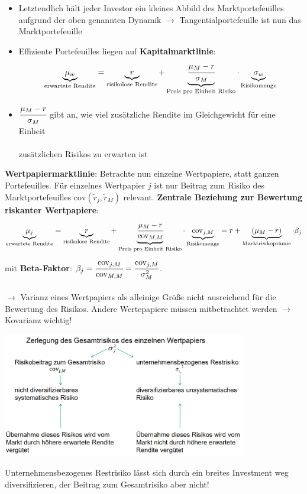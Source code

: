 \pagebreak
\begin{itemize}
	\item Letztendlich hält jeder Investor ein kleines Abbild des Marktportefeuilles aufgrund der oben genannten Dynamik $\rightarrow$ Tangentialportefeuille ist nun das Marktportefeuille
	\item Effiziente Portefeuilles liegen auf \textbf{Kapitalmarktlinie}:
	\[
	\underbrace{\mu_w}_\text{erwartete Rendite}=
	\underbrace{r}_\text{risikolose Rendite} + 
	\underbrace{\cfrac{\mu_M-r}{\sigma_M}}_\text{Preis pro Einheit Risiko}\cdot
	\underbrace{\sigma_w}_\text{Risikomenge}
	\]
	\item $\cfrac{\mu_M-r}{\sigma_M}$ gibt an, wie viel zusätzliche Rendite im Gleichgewicht für eine Einheit\\\\ zusätzlichen Risikos zu erwarten ist
\end{itemize}
\bigskip
\textbf{Wertpapiermarktlinie}: Betrachte nun einzelne Wertpapiere, statt ganzen Portefeuilles.
Für einzelnes Wertpapier $j$ ist nur Beitrag zum Risiko des Marktportefeuilles $\text{cov}(\tilde{r}_j,\tilde{r}_M)$ relevant.
\textbf{Zentrale Beziehung zur Bewertung riskanter Wertpapiere}:
\[
\underbrace{\mu_j}_\text{erwartete Rendite}=
\underbrace{r}_\text{risikolose Rendite} + 
\underbrace{\cfrac{\mu_M-r}{\text{cov}_{M,M}}}_\text{Preis pro Einheit Risiko}\cdot
\underbrace{\text{cov}_{j,M}}_\text{Risikomenge}= r +
\underbrace{(\mu_M-r)}_\text{Marktrisikoprämie}\cdot
\beta_j
\]
mit \textbf{Beta-Faktor}: $\beta_j=\cfrac{\text{cov}_{j,M}}{\text{cov}_{M,M}}=\cfrac{\text{cov}_{j,M}}{\sigma_M^2}$.\\\\
$\rightarrow$ Varianz eines Wertpapiers als alleinige Größe nicht ausreichend für die Bewertung des Risikos. Andere Wertepapiere müssen mitbetrachtet werden $\rightarrow$ Kovarianz wichtig!
\begin{center}
	\includegraphics[width=0.8\textwidth]{images/risk-overview.png}
\end{center}
Unternehmensbezogenes Restrisiko lässt sich durch ein breites Investment weg diversifizieren, der Beitrag zum Gesamtrisiko aber nicht!